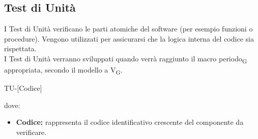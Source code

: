 \subsection{Test di Unità}
I Test di Unità verificano le parti atomiche del software (per esempio funzioni o procedure). Vengono utilizzati per assicurarsi che la logica interna del codice sia rispettata.\\I Test di Unità verranno sviluppati quando verrà raggiunto il macro periodo\textsubscript{G} appropriata, secondo il modello a V\textsubscript{G}.
\begin{center}
	TU-[Codice]\\
\end{center}
dove:
\begin{itemize}
	\item \textbf{Codice:} rappresenta il codice identificativo crescente del componente da verificare.
\end{itemize}

